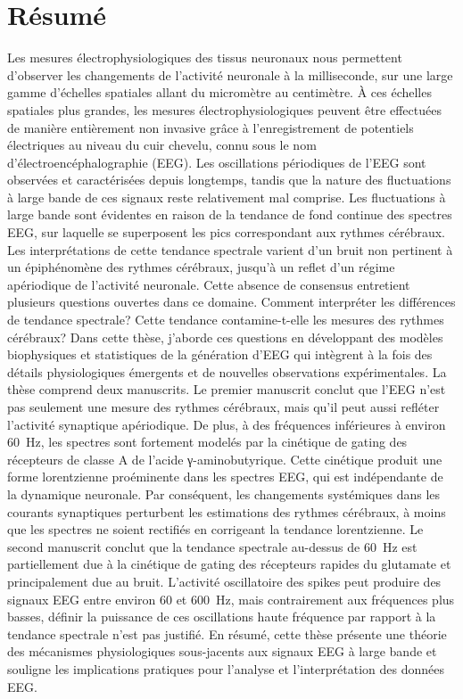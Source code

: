 \documentclass[11pt]{report}
\begin{document}
\newpage

\chapter*{Résumé}
Les mesures électrophysiologiques des tissus neuronaux nous permettent d'observer les changements de l'activité neuronale à la milliseconde, sur une large gamme d'échelles spatiales allant du micromètre au centimètre. À ces échelles spatiales plus grandes, les mesures électrophysiologiques peuvent être effectuées de manière entièrement non invasive grâce à l'enregistrement de potentiels électriques au niveau du cuir chevelu, connu sous le nom d'électroencéphalographie (EEG). Les oscillations périodiques de l'EEG sont observées et caractérisées depuis longtemps, tandis que la nature des fluctuations à large bande de ces signaux reste relativement mal comprise. Les fluctuations à large bande sont évidentes en raison de la tendance de fond continue des spectres EEG, sur laquelle se superposent les pics correspondant aux rythmes cérébraux. Les interprétations de cette tendance spectrale varient d'un bruit non pertinent à un épiphénomène des rythmes cérébraux, jusqu'à un reflet d'un régime apériodique de l'activité neuronale. Cette absence de consensus entretient plusieurs questions ouvertes dans ce domaine. Comment interpréter les différences de tendance spectrale? Cette tendance contamine-t-elle les mesures des rythmes cérébraux? Dans cette thèse, j'aborde ces questions en développant des modèles biophysiques et statistiques de la génération d'EEG qui intègrent à la fois des détails physiologiques émergents et de nouvelles observations expérimentales. La thèse comprend deux manuscrits. Le premier manuscrit conclut que l'EEG n'est pas seulement une mesure des rythmes cérébraux, mais qu'il peut aussi refléter l'activité synaptique apériodique. De plus, à des fréquences inférieures à environ \qty{60}{\hertz}, les spectres sont fortement modelés par la cinétique de gating des récepteurs de classe A de l'acide γ-aminobutyrique. Cette cinétique produit une forme lorentzienne proéminente dans les spectres EEG, qui est indépendante de la dynamique neuronale. Par conséquent, les changements systémiques dans les courants synaptiques perturbent les estimations des rythmes cérébraux, à moins que les spectres ne soient rectifiés en corrigeant la tendance lorentzienne. Le second manuscrit conclut que la tendance spectrale au-dessus de \qty{60}{\hertz} est partiellement due à la cinétique de gating des récepteurs rapides du glutamate et principalement due au bruit. L'activité oscillatoire des spikes peut produire des signaux EEG entre environ 60 et \qty{600}{\hertz}, mais contrairement aux fréquences plus basses, définir la puissance de ces oscillations haute fréquence par rapport à la tendance spectrale n'est pas justifié. En résumé, cette thèse présente une théorie des mécanismes physiologiques sous-jacents aux signaux EEG à large bande et souligne les implications pratiques pour l'analyse et l'interprétation des données EEG.
\end{document}
